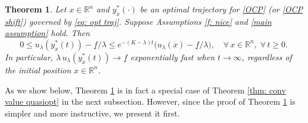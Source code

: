 \documentclass[12pt]{amsart}
\numberwithin{equation}{section}
\theoremstyle{plain}
\newtheorem{theorem}{Theorem}[section]
\begin{document}
\begin{theorem}\label{thm: conv value opt}
Let $x\in \mathbb{R}^{n}$ and  $y_{x}^{*}(\cdot)$ be an optimal trajectory for \eqref{OCP} (or \eqref{OCP shift}) governed by \eqref{eq: opt traj}. 
Suppose Assumptions \ref{f: nice} and \ref{main assumption} hold. Then
\begin{equation*}
    0\leq u_{\lambda}(y_{x}^{*}(t)) - \underline{f}/\lambda \leq e^{-(K-\lambda)t} \big(u_{\lambda}(x)-\underline{f}/\lambda\big),\quad \forall\,x\in\mathbb{R}^{n}, \; \forall\,t\geq 0.
\end{equation*}
In particular, $\lambda\,u_{\lambda}(y_{x}^{*}(t))\to \underline{f}$ exponentially fast when $t\to \infty$, regardless of the initial position $x\in \mathbb{R}^{n}$.
\end{theorem}

As we show below, Theorem \ref{thm: conv value opt} is in fact a special case of Theorem  \ref{thm: conv value quasiopt} in the next subsection. However, since the proof of Theorem \ref{thm: conv value opt} is simpler and more instructive, we present it first.
\end{document}
